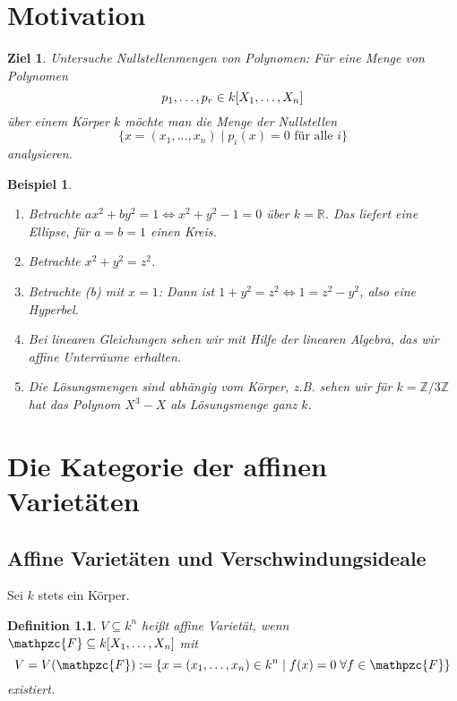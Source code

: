 \documentclass[a4paper,12pt]{scrbook}
\theoremstyle{blah}
\newtheorem*{ziel}{Ziel}
\newtheorem*{bsp*}{Beispiel}
\newtheorem{dfn}{Definition}[section]
\theoremstyle{stz}
\newcommand{\F}{\mathpzc{F}}
\newcommand{\set}[1]{\ensuremath{\mathbb{#1}}}
\newcommand{\R}{\set{R}}
\newcommand{\Z}{\set{Z}}
\newcommand{\polyx}{\ensuremath%
  [X_{1},\dotsc,X_{n}]}
\begin{document}

\chapter*{Motivation}

\begin{ziel}
Untersuche Nullstellenmengen von Polynomen: Für eine Menge von Polynomen
\[p_{1},\dotsc,p_{r}\in k\polyx\]
über einem Körper $k$ möchte man die Menge der Nullstellen
\[\{x=(x_{1},\dotsc,x_{n})\mid p_{i}(x)=0\text{ für alle }i\}\]
analysieren.
\end{ziel}

\begin{bsp*}
\begin{enumerate}
\item Betrachte $ax^{2}+by^{2}=1\iff x^{2}+y^{2}-1=0$ über $k=\R$. Das liefert eine Ellipse, für $a=b=1$ einen Kreis.
\item Betrachte $x^{2}+y^{2}=z^{2}$.
\item Betrachte (b) mit $x=1$: Dann ist $1+y^{2}=z^{2}\iff 1=z^{2}-y^{2}$, also eine Hyperbel.
\item Bei linearen Gleichungen sehen wir mit Hilfe der linearen Algebra, das wir affine Unterräume erhalten.
\item Die Lösungsmengen sind abhängig vom Körper, z.B. sehen wir für $k=\Z/3\Z$ hat das Polynom $X^{3}-X$ als Lösungsmenge ganz $k$.
\end{enumerate}
\end{bsp*}


\chapter{Die Kategorie der affinen Varietäten}
\section{Affine Varietäten und Verschwindungsideale}

Sei $k$ stets ein Körper.

\begin{dfn}
$V\subseteq k^{n}$ heißt \emph{affine Varietät}, wenn
$\F\subseteq k\polyx$
mit \[V=V(\F):=\{x=(x_{1},\dotsc,x_{n})\in k^{n}\mid f(x)=0\;\forall f\in\F\}\] existiert.
\end{dfn}
\end{document}
